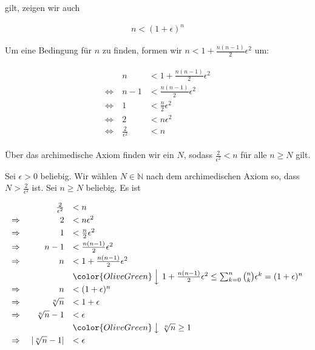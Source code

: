 \documentclass[fontsize=9pt,
               parskip=half-,
               DIV=14,
               listof=chapterentry,
               tocflat]{scrbook}
\begin{document}
\begin{solutionprocess*}
gilt, zeigen wir auch

\begin{align*}
n<(1+\epsilon )^{n}
\end{align*}

Um eine Bedingung für $n$ zu finden, formen wir $n<1+{\tfrac {n(n-1)}{2}}\epsilon ^{2}$ um:

\begin{align*}
{\begin{array}{rrl}&n&<1+{\frac {n(n-1)}{2}}\epsilon ^{2}\\[0.3em]\Leftrightarrow \ &n-1&<{\frac {n(n-1)}{2}}\epsilon ^{2}\\[0.3em]\Leftrightarrow \ &1&<{\frac {n}{2}}\epsilon ^{2}\\[0.3em]\Leftrightarrow \ &2&<n\epsilon ^{2}\\[0.3em]\Leftrightarrow \ &{\frac {2}{\epsilon ^{2}}}&<n\end{array}}
\end{align*}

Über das archimedische Axiom finden wir ein $N$, sodass ${\tfrac {2}{\epsilon ^{2}}}<n$ für alle $n\geq N$ gilt.

\end{solutionprocess*}

\begin{proof*}
Sei $\epsilon >0$ beliebig. Wir wählen $N\in \mathbb {N} $ nach dem archimedischen Axiom so, dass $N>{\tfrac {2}{\epsilon ^{2}}}$ ist. Sei $n\geq N$ beliebig. Es ist

\begin{align*}
{\begin{array}{rrl}&{\frac {2}{\epsilon ^{2}}}&<n\\[0.3em]\Rightarrow \ &2&<n\epsilon ^{2}\\[0.3em]\Rightarrow \ &1&<{\frac {n}{2}}\epsilon ^{2}\\[0.3em]\Rightarrow \ &n-1&<{\frac {n(n-1)}{2}}\epsilon ^{2}\\[0.3em]\Rightarrow \ &n&<1+{\frac {n(n-1)}{2}}\epsilon ^{2}\\[0.3em]&&{\color {OliveGreen}\left\downarrow \ 1+{\frac {n(n-1)}{2}}\epsilon ^{2}\leq \sum _{k=0}^{n}{\binom {n}{k}}\epsilon ^{k}=(1+\epsilon )^{n}\right.}\\[0.3em]\Rightarrow \ &n&<(1+\epsilon )^{n}\\[0.3em]\Rightarrow \ &{\sqrt[{n}]{n}}&<1+\epsilon \\[0.3em]\Rightarrow \ &{\sqrt[{n}]{n}}-1&<\epsilon \\[0.3em]&&{\color {OliveGreen}\left\downarrow \ {\sqrt[{n}]{n}}\geq 1\right.}\\[0.3em]\Rightarrow \ &\left|{\sqrt[{n}]{n}}-1\right|&<\epsilon \\[0.3em]\end{array}}
\end{align*}

\end{proof*}
\end{document}
